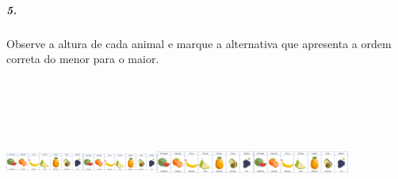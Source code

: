 \subparagraph{5. }\label{section-134}

Observe a altura de cada animal e marque a alternativa que apresenta a
ordem correta do menor para o maior.

\includegraphics[width=1.01000in,height=2.21875in]{media/image143.png}\includegraphics[width=0.97225in,height=2.21875in]{media/image143.png}\includegraphics[width=1.26550in,height=2.21875in]{media/image143.png}\includegraphics[width=1.24230in,height=2.21875in]{media/image143.png}

